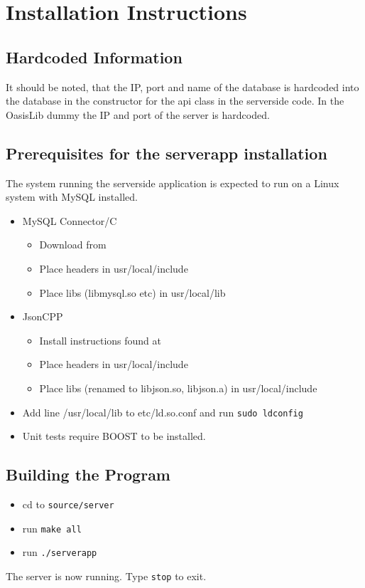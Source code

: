 \section{Installation Instructions}

\subsection{Hardcoded Information}
It should be noted, that the IP, port and name of the database is hardcoded into the database in the constructor for the \ac{api} class in the serverside code. In the OasisLib dummy the IP and port of the server is hardcoded.

\subsection{Prerequisites for the serverapp installation}
The system running the serverside application is expected to run on a Linux system with MySQL installed.

\begin{itemize}
\item MySQL Connector/C
\begin{itemize}
	\item Download from \cite{mysqlconnector}
	\item Place headers in usr/local/include
	\item Place libs (libmysql.so etc) in usr/local/lib
\end{itemize}
\item JsonCPP
\begin{itemize}
	\item Install instructions found at \citep{jsoncppinstall}
	\item Place headers in usr/local/include
	\item Place libs (renamed to libjson.so, libjson.a) in usr/local/include
\end{itemize}
\item Add line /usr/local/lib to etc/ld.so.conf and run \lstinline|sudo ldconfig|
\item Unit tests require BOOST to be installed.\citep{boostinstall}
\end{itemize}

\subsection{Building the Program}
\begin{itemize}
\item cd to \lstinline|source/server|
\item run \lstinline|make all|
\item run \lstinline|./serverapp|
\end{itemize}
The server is now running. Type \lstinline|stop| to exit.

